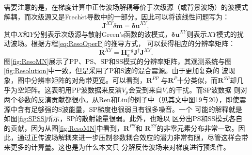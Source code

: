 需要注意的是，在梯度计算中正传波场解耦等价于次级源（或背景波场）的波模式解耦，而次级源又是Frech{$\acute{e}$}t导数中的一部分。因此可以将该线性问题写为：
\begin{equation}
    \mathbf{J}^{XY}\delta\mathbf{m}=\mathbf{\delta u}^{XY},
    \label{eq:JXY}
\end{equation}
其中$X$和$Y$分别表示次级源与散射Green's函数的波模式，$\mathbf{\delta u}^{XY}$则表示${X}{Y}$模式的扰动波场。根据方程\eqref{eq:ResoOperP}的推导方式，
可以获得相应的分辨率矩阵：
\begin{equation}
    \mathbf{R}^{XY}=\mathbf{H}_a^{-g}\mathbf{J}^{\dagger}\mathbf{J}^{XY}. 
    \label{eq:RXY}  
\end{equation}
图\ref{fig:ResoMN}展示了PP、PS、SP和SS模式的分辨率矩阵，其观测系统与图\ref{fig:Resolution}中一致，但是采用了P和S波的混合震源。由于更加复杂的
波现象，图中分辨率矩阵的对角带更宽。可以看到，$\mathbf{R}^{PP}$ 与$\mathbf{R}^P$十分类似，而$\mathbf{R}^{SP}$却几乎为空矩阵。这表明用PP波数据来反演$V_p$会受到来自$V_s$的干扰。而SP波数据
则对两个参数的反演贡献都很小。从Ren和Liu\cite{ren.liu:2016}的例子中（见其文中图19与20），即使震源中含有足够强的S波能量，SP梯度也很弱且有很多噪音。一个
可能的解释就是如图\ref{fig:SPSS}所示，SP的散射能量很弱。此外，也难以
区分出PS和SS模式各自的贡献，因为从图\ref{fig:ResoMN}中看到，$\mathbf{R}^{PS}$和
$\mathbf{R}^{SS}$的非零元素分布非常一致。因此，通过正传波场解耦来进一步压制参数耦合效应的潜力非常有限，尽管这样会带来更多的计算量。这也是为什么本文只
分解反传波场来对梯度进行预条件。
